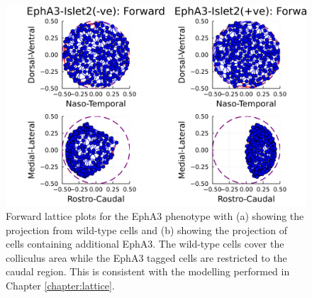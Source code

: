 \begin{figure}[hbt!]
	\centering
	\includegraphics[width=\textwidth]{images/distributed_kernels/figure_lattice_EphA3_pre}

	\def\c{Forward lattice plots for the homozygous EphA3 knock-in phenotype showing the projection from wild-type cells and the projection of cells containing additional EphA3.}
	\caption[\c]{\label{fig:epha3_lattice_pre} Forward lattice plots for the EphA3 phenotype with (a) showing the projection from wild-type cells and (b) showing the projection of cells containing additional EphA3. The wild-type cells cover the colliculus area while the EphA3 tagged cells are restricted to the caudal region. This is consistent with the modelling performed in Chapter \ref{chapter:lattice}.}
\end{figure}


